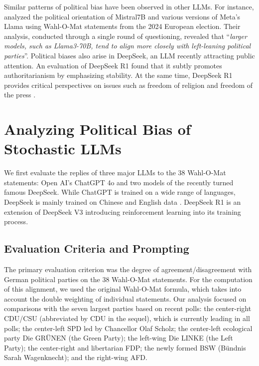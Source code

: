 \documentclass[
	fontsize=10pt,          %
	numbers=noenddot,    	%
    parskip=half,        	%
    listof=totoc,        	%
    bibliography=totoc,  	%
	headsepline=true,       %
	footsepline=false, 		%
    DIV=12                	%
]{scrartcl}
\begin{document}
Similar patterns of political bias have been observed in other LLMs.
For instance, \cite{rettenberger2024assessing} analyzed the political orientation of Mistral7B and various versions of Meta's Llama using Wahl-O-Mat statements from the 2024 European election.
Their analysis, conducted through a single round of questioning, revealed that \enquote{\itshape larger models, such as Llama3-70B, tend to align more closely with left-leaning political parties}.
Political biases also arise in DeepSeek, an LLM recently attracting public attention.
An evaluation of DeepSeek R1 found that it subtly promotes authoritarianism by emphasizing stability.
At the same time, DeepSeek R1 provides critical perspectives on issues such as freedom of religion and freedom of the press \citep{gupta2025comparative}.


\section{Analyzing  Political Bias of Stochastic LLMs}%
\label{sec:stochastic-llms}

We first evaluate the replies of three major LLMs to the 38 Wahl-O-Mat statements: Open AI's ChatGPT 4o \citep{hurst2024gpt} and two models of the recently turned famous DeepSeek. While ChatGPT is trained on a wide range of languages, DeepSeek is mainly trained on Chinese and English data \citep{guo2025deepseek}. DeepSeek R1 is an extension of DeepSeek V3 introducing reinforcement learning into its training process. 


\subsection{Evaluation Criteria and Prompting}

 The primary evaluation criterion was the degree of agreement/disagreement with German political parties on the 38 Wahl-O-Mat statements. 
 For the computation of this alignment, we used the original Wahl-O-Mat formula, which takes into account the double weighting of individual statements. Our analysis focused on comparisons with the seven largest parties based on recent polls: the center-right CDU/CSU (abbreviated by CDU in the sequel), which is currently leading in all polls; the center-left SPD led by Chancellor Olaf Scholz; the center-left ecological party Die GR\"UNEN (the Green Party); the left-wing Die LINKE (the Left Party); the center-right and libertarian FDP; the newly formed BSW (B\"undnis Sarah Wagenknecht);  and the right-wing  AFD.
\end{document}
